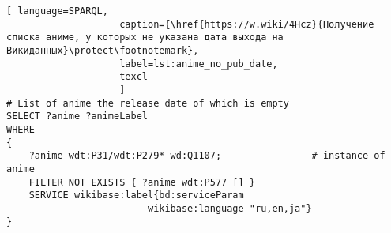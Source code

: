 \begin{lstlisting}[ language=SPARQL, 
                    caption={\href{https://w.wiki/4Hcz}{Получение списка аниме, у которых не указана дата выхода на Викиданных}\protect\footnotemark},
                    label=lst:anime_no_pub_date,
                    texcl 
                    ]
# List of anime the release date of which is empty
SELECT ?anime ?animeLabel
WHERE
{
    ?anime wdt:P31/wdt:P279* wd:Q1107;                # instance of anime
    FILTER NOT EXISTS { ?anime wdt:P577 [] }
    SERVICE wikibase:label{bd:serviceParam
					     wikibase:language "ru,en,ja"}
}
\end{lstlisting}%
